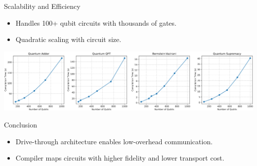 \documentclass{beamer}
\begin{document}
	
	\begin{frame}{Scalability and Efficiency}
		\begin{itemize}
			\item Handles 100+ qubit circuits with thousands of gates.
			\item Quadratic scaling with circuit size.
		\end{itemize}
		\includegraphics[width=\textwidth]{figure/time.png}
	\end{frame}
	
	\begin{frame}{Conclusion}
		\begin{itemize}
			\item Drive-through architecture enables low-overhead communication.
			\item Compiler maps circuits with higher fidelity and lower transport cost.
		\end{itemize}
	\end{frame}
	
\end{document}
